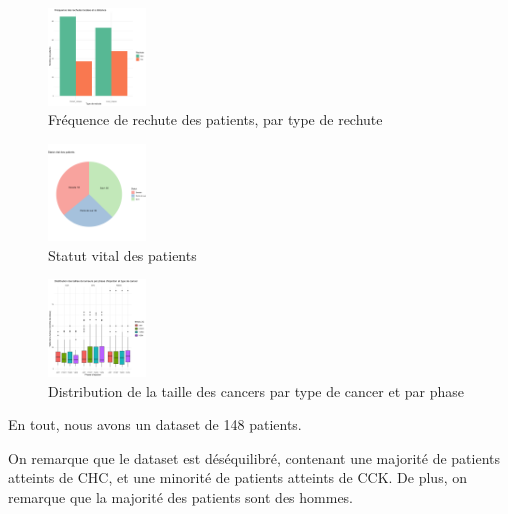 \begin{figure}[H]
\centering
\includegraphics[width=0.23\textwidth]{img/freq-rechute.png}
\caption{Fréquence de rechute des patients, par type de rechute}
\end{figure}

\begin{figure}[H]
\centering
\includegraphics[width=0.23\textwidth]{img/statut-vital.png}
\caption{Statut vital des patients}
\end{figure}

\begin{figure}[H]
\centering
\includegraphics[width=0.23\textwidth]{img/taille-cancer.png}
\caption{Distribution de la taille des cancers par type de cancer et par phase}
\end{figure}

En tout, nous avons un dataset de 148 patients.

On remarque que le dataset est déséquilibré, contenant une majorité de patients atteints de CHC, et une minorité de patients atteints de CCK. De plus, on remarque que la majorité des patients sont des hommes.
